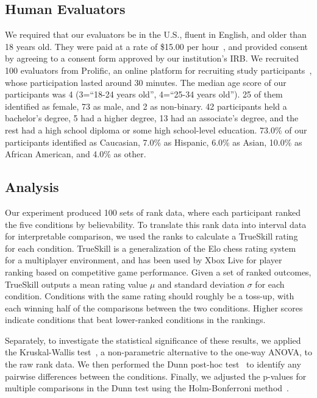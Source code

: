 \subsection{Human Evaluators}
We required that our evaluators be in the U.S., fluent in English, and older than 18 years old. They were paid at a rate of \$15.00 per hour~\cite{16_rolf2015fight}, and provided consent by agreeing to a consent form approved by our institution’s IRB. We recruited 100 evaluators from Prolific, an online platform for recruiting study participants~\cite{17_prolific2022}, whose participation lasted around 30 minutes. The median age score of our participants was 4 (3=``18-24 years old'', 4=``25-34 years old''). 25 of them identified as female, 73 as male, and 2 as non-binary. 42 participants held a bachelor's degree, 5 had a higher degree, 13 had an associate's degree, and the rest had a high school diploma or some high school-level education. 73.0\% of our participants identified as Caucasian, 7.0\% as Hispanic, 6.0\% as Asian, 10.0\% as African American, and 4.0\% as other. 

\subsection{Analysis}
Our experiment produced 100 sets of rank data, where each participant ranked the five conditions by believability. To translate this rank data into interval data for interpretable comparison, we used the ranks to calculate a TrueSkill rating~\cite{79_TrueSkill} for each condition. TrueSkill is a generalization of the Elo chess rating system~\cite{80_Elo} for a multiplayer environment, and has been used by Xbox Live for player ranking based on competitive game performance. Given a set of ranked outcomes, TrueSkill outputs a mean rating value $\mu$ and standard deviation $\sigma$ for each condition. Conditions with the same rating should roughly be a toss-up, with each winning half of the comparisons between the two conditions. Higher scores indicate conditions that beat lower-ranked conditions in the rankings. 

Separately, to investigate the statistical significance of these results, we applied the Kruskal-Wallis test~\cite{Kruskal1952}, a non-parametric alternative to the one-way ANOVA, to the raw rank data. We then performed the Dunn post-hoc test~\cite{Upton2006} to identify any pairwise differences between the conditions. Finally, we adjusted the p-values for multiple comparisons in the Dunn test using the Holm-Bonferroni method~\cite{Holm1979}.

